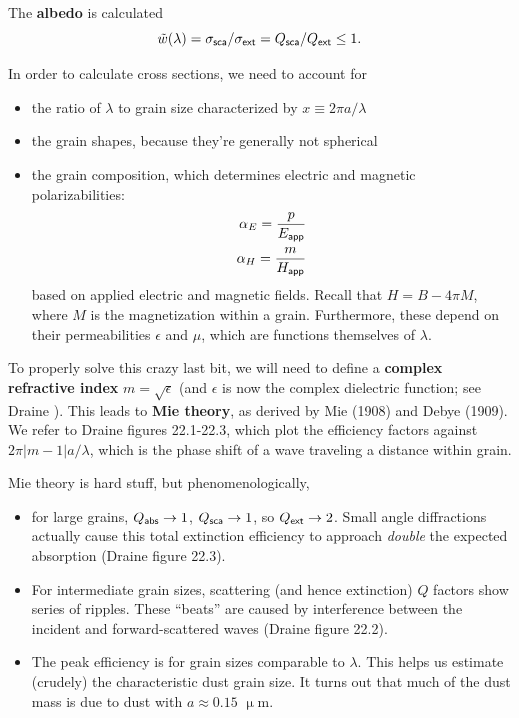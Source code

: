 \documentclass{tufte-handout}
\renewcommand{\textbf}[1]{{\bf \textcolor{dark-gray}{#1}}}
\renewcommand{\rm}{\sf}
\newcommand{\m}{\upmu} %
\newcommand{\um}{$\m{}$m}
\begin{document}
The \textbf{albedo} is calculated
\[\tilde w(\lambda) = \sigma_{\rm sca}/ \sigma_{\rm ext} = Q_{\rm sca}/Q_{\rm ext} \leq 1.\] 

In order to calculate cross sections, we need to account for
\begin{itemize}
\item the ratio of $\lambda$ to grain size characterized by $x \equiv 2\pi a / \lambda$ 
\item the grain shapes, because they're generally not spherical
\item the grain composition, which determines electric and magnetic polarizabilities:
\begin{align}
\alpha_E = \frac{p}{E_{\rm app}}\\
\alpha_H = \frac{m}{H_{\rm app}}
\end{align}
based on applied electric and magnetic fields. Recall that $H = B - 4\pi M$, where $M$ is the magnetization within a grain. Furthermore, these depend on their permeabilities $\epsilon$ and $\mu$, which are functions themselves of $\lambda$.
\end{itemize}

To properly solve this crazy last bit, we will need to define a \textbf{complex refractive index} $m = \sqrt \epsilon$ (and $\epsilon$ is now the complex dielectric function; see Draine ). This leads to \textbf{Mie theory}, as derived by Mie (1908) and Debye (1909). We refer to Draine figures 22.1-22.3, which plot the efficiency factors against $2\pi |m-1| a/\lambda$, which is the phase shift of a wave traveling a distance within grain.

Mie theory is hard stuff, but phenomenologically,
\begin{itemize}
\item for large grains, $Q_{\rm abs} \rightarrow 1$, $Q_{\rm sca} \rightarrow 1$, so $Q_{\rm ext} \rightarrow 2$. Small angle diffractions actually cause this total extinction efficiency to approach \textit{double} the expected absorption (Draine figure 22.3).
\item For intermediate grain sizes, scattering (and hence extinction) $Q$ factors show series of ripples. These ``beats'' are caused by interference between the incident and forward-scattered waves (Draine figure 22.2).
\item The peak efficiency is for grain sizes comparable to $\lambda$. This helps us estimate (crudely) the characteristic dust grain size. It turns out that much of the dust mass is due to dust with $a \approx 0.15$ \um{}. 
\end{itemize}
\end{document}
